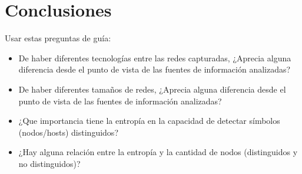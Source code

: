\section{Conclusiones}

Usar estas preguntas de gu\'ia:

\begin{itemize}
	\item De haber diferentes tecnologías entre las redes capturadas, ¿Aprecia alguna diferencia desde el punto de vista de las fuentes de información analizadas?
	\item De haber diferentes tamaños de redes, ¿Aprecia alguna diferencia desde el punto de vista de las fuentes de información analizadas?
	\item ¿Que importancia tiene la entropía en la capacidad de detectar símbolos (nodos/hosts) distinguidos?
	\item ¿Hay alguna relación entre la entropía y la cantidad de nodos (distinguidos y no distinguidos)?
\end{itemize}
